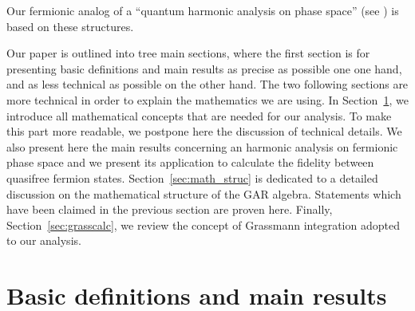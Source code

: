 \documentclass[pra,twoside,amsmath,amsfonts,amssymb,superscriptaddress,showpacs]{revtex4}
\begin{document}
Our fermionic analog of a ``quantum harmonic analysis on phase space'' (see \cite{WeQMPS}) is based
on these structures. 


Our paper is outlined into tree main sections, where the first section is for presenting basic
definitions and main results as precise as possible one one hand, and as less technical as possible
on the other hand. The two following sections are more technical in order to explain the mathematics
we are using. In Section~\ref{sec:basic}, we introduce all mathematical
concepts that are needed for our analysis. To make this part more readable, we postpone here the
discussion of technical details. We also present here the main results concerning an harmonic
analysis on fermionic phase space and we present its application to calculate the fidelity
between quasifree fermion states. Section~\ref{sec:math_struc} is dedicated to a detailed
discussion on the mathematical structure of the GAR algebra. Statements which have been claimed in
the previous section are proven here. Finally, Section~\ref{sec:grasscalc}, we review the concept
of Grassmann integration adopted to our analysis.  
 

\section{Basic definitions and main results}
\label{sec:basic}

\end{document}
